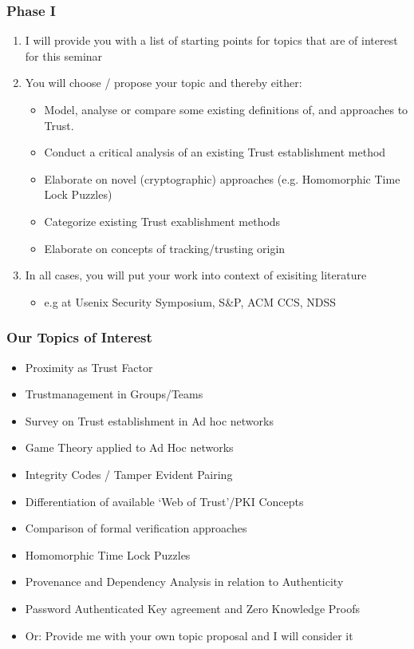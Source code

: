 \documentclass[xcolor={usenames,dvipsnames}]{beamer}
\begin{document}
\begin{frame}
	\frametitle{Phase \alert{I}}
	\begin{enumerate}
		\item I will provide you with a list of starting points for topics that are of interest for this seminar
		\item You will \alert{choose / propose} your topic and thereby either:
			\begin{itemize}
				\item Model, analyse or compare some existing definitions of, and approaches to Trust.
				\item Conduct a critical analysis of an existing Trust establishment method
				\item Elaborate on novel (cryptographic) approaches (e.g. Homomorphic Time Lock Puzzles)
				\item Categorize existing Trust exablishment methods 
				\item Elaborate on concepts of tracking/trusting origin
			\end{itemize}
		\item In all cases, you will put your work into context of exisiting literature
			\begin{itemize}
				\item e.g at Usenix Security Symposium, S\&P, ACM CCS, NDSS
			\end{itemize}
	\end{enumerate}
\end{frame}

\begin{frame}
	\frametitle{Our Topics of Interest}
	\begin{itemize}
		\item Proximity as Trust Factor
		\item Trustmanagement in Groups/Teams
		\item Survey on Trust establishment in Ad hoc networks
		\item Game Theory applied to Ad Hoc networks
		\item Integrity Codes / Tamper Evident Pairing
		\item Differentiation of available `Web of Trust'/PKI Concepts
		\item Comparison of formal verification approaches
		\item Homomorphic Time Lock Puzzles
		\item Provenance and Dependency Analysis in relation to Authenticity
		\item Password Authenticated Key agreement and Zero Knowledge Proofs
		\item \alert{Or:} Provide me with your own topic proposal and I will consider it
	\end{itemize}
\end{frame}
\end{document}
